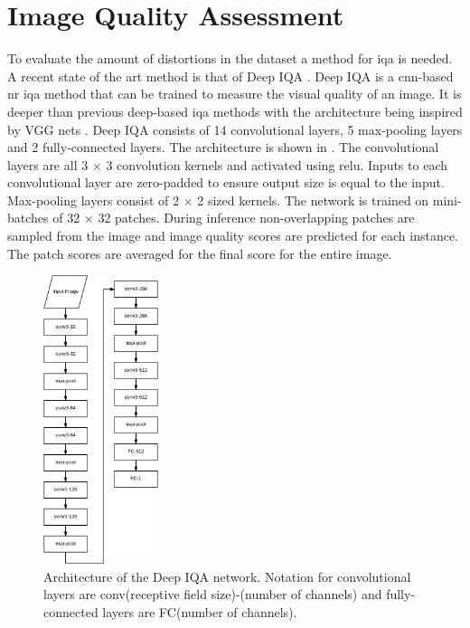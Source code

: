 \section{Image Quality Assessment}\label{sec:iqaimp}
To evaluate the amount of distortions in the dataset a method for \gls{iqa} is needed. A recent state of the art method is that of Deep IQA \cite{deepiqa}. Deep IQA is a \gls{cnn}-based \gls{nr} \gls{iqa} method that can be trained to measure the visual quality of an image. It is deeper than previous deep-based \gls{iqa} methods with the architecture being inspired by VGG nets \cite{vgg}. Deep IQA consists of 14 convolutional layers, 5 max-pooling layers and 2 fully-connected layers. The architecture is shown in . The convolutional layers are all 3 $\times$ 3 convolution kernels and activated using \gls{relu}. Inputs to each convolutional layer are zero-padded to ensure output size is equal to the input. Max-pooling layers consist of 2 $\times$ 2 sized kernels. The network is trained on mini-batches of 32 $\times$ 32 patches. During inference non-overlapping patches are sampled from the image and image quality scores are predicted for each instance. The patch scores are averaged for the final score for the entire image. 

\begin{figure}[H]
  \centering
    \includegraphics[width=0.3\textwidth]{Figs/Implementation/deepiqa_arch.pdf}
      \caption{Architecture of the Deep IQA network. Notation for convolutional layers are conv(receptive field size)-(number of channels) and fully-connected layers are FC(number of channels).}
    \label{fig:deepiqa_arch}
\end{figure}


